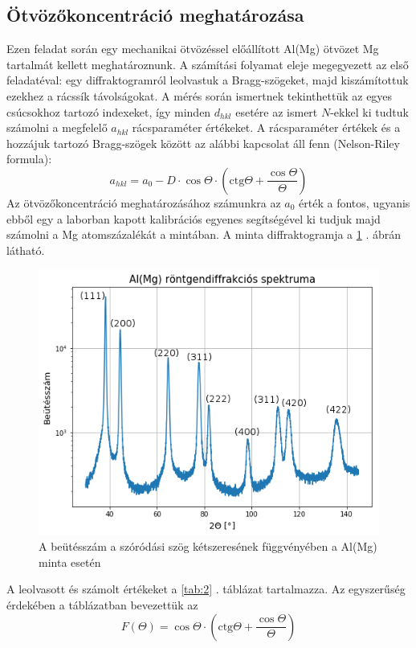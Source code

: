 \documentclass[12pt,a4paper]{article}
\begin{document}
\subsection{Ötvözőkoncentráció meghatározása}
\hspace*{10pt} Ezen feladat során egy mechanikai ötvözéssel előállított Al(Mg) ötvözet Mg tartalmát kellett meghatároznunk. A számítási folyamat eleje megegyezett az első feladatéval: egy diffraktogramról leolvastuk a Bragg-szögeket, majd kiszámítottuk ezekhez a rácssík távolságokat. A mérés során ismertnek tekinthettük az egyes csúcsokhoz tartozó indexeket, így minden $d_{hkl}$ esetére az ismert $N$-ekkel ki tudtuk számolni a megfelelő $a_{hkl}$ rácsparaméter értékeket. A rácsparaméter értékek és a hozzájuk tartozó Bragg-szögek között az alábbi kapcsolat áll fenn (Nelson-Riley formula):
$$a_{hkl}= a_0 - D \cdot \cos \Theta \cdot \left( \textrm{ctg}\Theta + \frac{\cos \Theta}{\Theta} \right)$$
Az ötvözőkoncentráció meghatározásához számunkra az $a_0$ érték a fontos, ugyanis ebből egy a laborban kapott kalibrációs egyenes segítségével ki tudjuk majd számolni a Mg atomszázalékát a mintában. A minta diffraktogramja a \ref{fig:2} . ábrán látható. 
\begin{figure}[!h]
\centering
\includegraphics[scale=0.75]{AlMg_ind}
\caption{A beütésszám a szóródási szög kétszeresének függvényében a Al(Mg) minta esetén}
\label{fig:2}
\end{figure}
\newpage
A leolvasott és számolt értékeket a \ref{tab:2} . táblázat tartalmazza. Az egyszerűség érdekében a táblázatban bevezettük az
$$F(\Theta)=\cos \Theta \cdot \left( \textrm{ctg}\Theta + \frac{\cos \Theta}{\Theta} \right)$$
\end{document}
